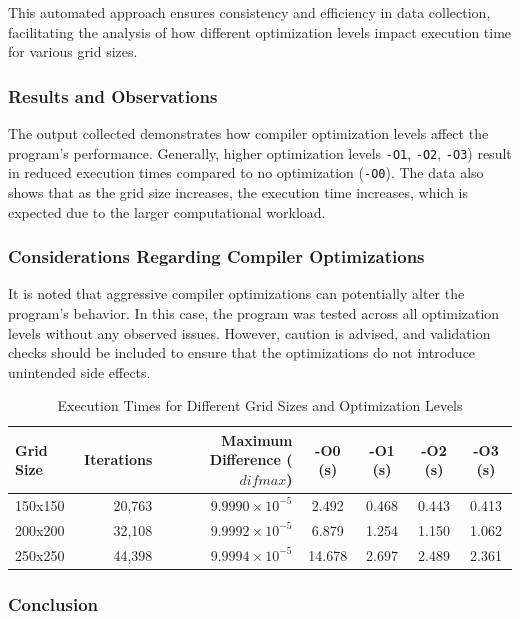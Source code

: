 \documentclass{article}
\begin{document}
This automated approach ensures consistency and efficiency in data collection, facilitating the analysis of how different optimization levels impact execution time for various grid sizes.

\subsubsection{Results and Observations}

The output collected demonstrates how compiler optimization levels affect the program's performance. Generally, higher optimization levels \texttt{-O1}, \texttt{-O2}, \texttt{-O3}) result in reduced execution times compared to no optimization (\texttt{-O0}). The data also shows that as the grid size increases, the execution time increases, which is expected due to the larger computational workload.

\subsubsection{Considerations Regarding Compiler Optimizations}

It is noted that aggressive compiler optimizations can potentially alter the program's behavior. In this case, the program was tested across all optimization levels without any observed issues. However, caution is advised, and validation checks should be included to ensure that the optimizations do not introduce unintended side effects.

\begin{table}[H]
    \centering
    \caption{Execution Times for Different Grid Sizes and Optimization Levels}
    \label{tab:execution_times}
    \begin{tabular}{lrrcccc}
    \toprule
    \textbf{Grid Size} & \textbf{Iterations} & \textbf{Maximum Difference ($difmax$)} & \textbf{-O0 (s)} & \textbf{-O1 (s)} & \textbf{-O2 (s)} & \textbf{-O3 (s)} \\
    \midrule
    150x150 & 20,763 & $9.9990 \times 10^{-5}$ & 2.492 & 0.468 & 0.443 & 0.413 \\
    200x200 & 32,108 & $9.9992 \times 10^{-5}$ & 6.879 & 1.254 & 1.150 & 1.062 \\
    250x250 & 44,398 & $9.9994 \times 10^{-5}$ & 14.678 & 2.697 & 2.489 & 2.361 \\
    \bottomrule
    \end{tabular}
\end{table}

\subsubsection{Conclusion}
\end{document}
